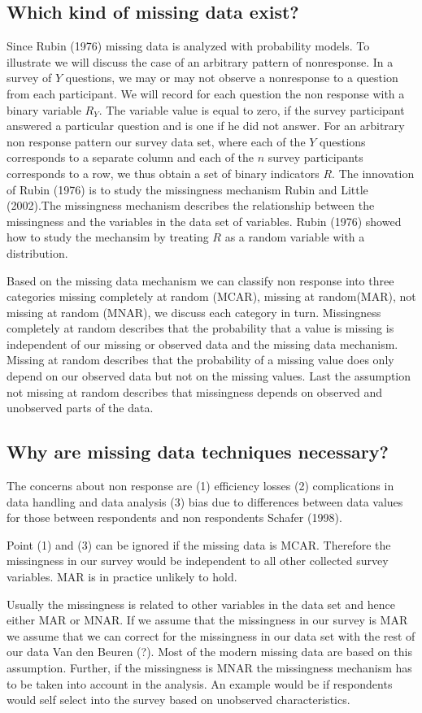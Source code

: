 \subsection{Which kind of missing data exist?} 
Since Rubin (1976) missing data is analyzed with probability models. 
To illustrate we will discuss the case of an arbitrary pattern of nonresponse.
In a survey of $Y$ questions, we may or may not observe a nonresponse to a question from each participant. 
We will record for each question the non response with a binary variable $R_Y$. 
The variable value is equal to zero, if the survey participant answered a particular question and is one if he did not answer. 
For an arbitrary non response pattern our survey data set, where each of the $Y$ questions corresponds to a separate column and each of the $n$ survey participants corresponds to a row, we thus obtain a set of binary indicators $R$.
The innovation of Rubin (1976) is to study the missingness mechanism Rubin and Little (2002).The missingness mechanism describes the relationship between the missingness and the variables in the data set of variables. Rubin (1976) showed how to study the mechansim by treating $R$ as a random variable with a distribution. \par
Based on the missing data mechanism we can classify non response into three categories missing completely at random (MCAR), missing at random(MAR), not missing at random (MNAR), we discuss each category in turn.  Missingness completely at random describes that the probability that a value is missing is independent of our missing or observed data and the missing data mechanism. 
Missing at random describes that the probability of a missing value does only depend on our observed data but not on the missing values. 
Last the assumption not missing at random describes that missingness depends on observed and unobserved parts of the data. \par

\subsection{Why are missing data techniques necessary?}

The concerns about non response are (1) efficiency losses (2) complications in data handling and data analysis (3) bias due to differences between data values for those between respondents and non respondents  Schafer (1998). \par 
Point (1) and (3) can be ignored if the missing data is MCAR. 
Therefore the missingness in our survey would be independent to all other collected survey variables. MAR is in practice unlikely to hold. \par 
Usually the missingness is related to other variables in the data set and hence either MAR or MNAR. 
If we assume that the missingness in our survey is  MAR we assume that we can correct for the missingness in our data set with the rest of our data Van den Beuren (?).  Most of the modern missing data are based on this assumption. Further, if the missingness is MNAR the missingness mechanism has to be taken into account in the analysis. An example would be if respondents would self select into the survey based on unobserved characteristics. 

